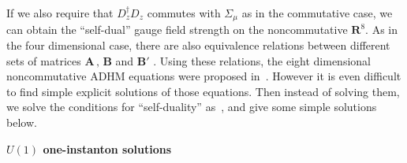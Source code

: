 \documentclass[a4paper,12pt]{article}
\begin{document}
If we also require that $D^{\dagger}_zD_z$ commutes with $\Sigma_{\mu}$ 
as in the commutative case, 
we can obtain the ``self-dual'' gauge field strength on the 
noncommutative $\mathbf{R}^8$. 
As in the four dimensional case, there are also equivalence relations 
between different sets of matrices $\mathbf{A}\,,\,\mathbf{B}$ and 
$\mathbf{B}'$ .
Using these relations, the eight dimensional noncommutative ADHM equations 
 were proposed in~\cite{ohta}.
However it is even difficult to find simple explicit solutions 
of those equations.
Then instead of solving them, we solve the conditions for ``self-duality'' 
as~\cite{pt}, and give some simple solutions below.



\begin{flushleft}
\textbf{$U(1)$ one-instanton solutions}
\end{flushleft}
\end{document}
